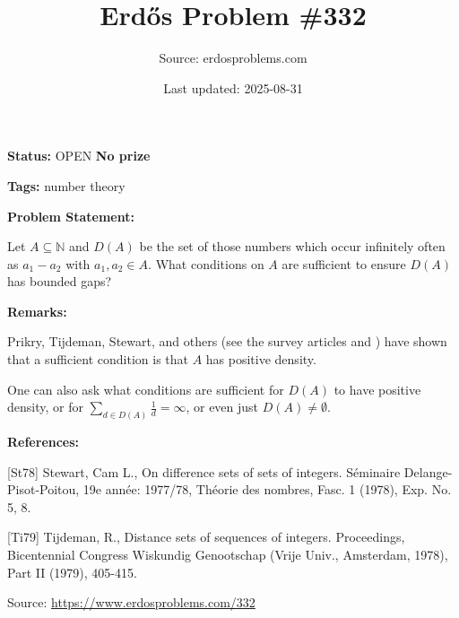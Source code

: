 \documentclass{article}
\title{Erd\H{o}s Problem \#332}
\date{Last updated: 2025-08-31}
\author{Source: erdosproblems.com}
\begin{document}
\maketitle

\noindent\textbf{Status:} OPEN \quad \textbf{No prize}

\noindent\textbf{Tags:} number theory

\medskip
\noindent\textbf{Problem Statement:}

Let $A\subseteq \mathbb{N}$ and $D(A)$ be the set of those numbers which occur infinitely often as $a_1-a_2$ with $a_1,a_2\in A$. What conditions on $A$ are sufficient to ensure $D(A)$ has bounded gaps?

\bigskip
\noindent\textbf{Remarks:}

Prikry, Tijdeman, Stewart, and others (see the survey articles \cite{St78} and \cite{Ti79}) have shown that a sufficient condition is that $A$ has positive density.

One can also ask what conditions are sufficient for $D(A)$ to have positive density, or for $\sum_{d\in D(A)}\frac{1}{d}=\infty$, or even just $D(A)\neq\emptyset$.

\bigskip
\noindent\textbf{References:}

[St78] Stewart, Cam L., On difference sets of sets of integers. S\'{e}minaire Delange-Pisot-Poitou, 19e ann\'{e}e:
1977/78, Th\'{e}orie des nombres, Fasc. 1 (1978), Exp. No. 5, 8.
 
 [Ti79] Tijdeman, R., Distance sets of sequences of integers. Proceedings, Bicentennial Congress Wiskundig
Genootschap (Vrije Univ., Amsterdam, 1978), Part
II (1979), 405-415.

\bigskip
\noindent\small{Source: \url{https://www.erdosproblems.com/332}}
\end{document}
